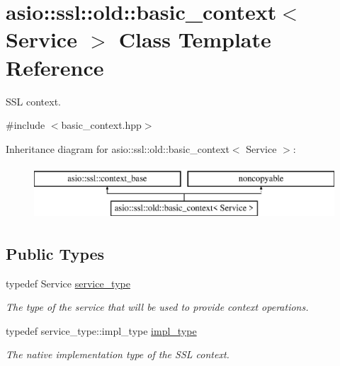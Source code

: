 \hypertarget{classasio_1_1ssl_1_1old_1_1basic__context}{}\section{asio\+:\+:ssl\+:\+:old\+:\+:basic\+\_\+context$<$ Service $>$ Class Template Reference}
\label{classasio_1_1ssl_1_1old_1_1basic__context}


S\+S\+L context.  




{\ttfamily \#include $<$basic\+\_\+context.\+hpp$>$}

Inheritance diagram for asio\+:\+:ssl\+:\+:old\+:\+:basic\+\_\+context$<$ Service $>$\+:\begin{figure}[H]
\begin{center}
\leavevmode
\includegraphics[height=2.000000cm]{classasio_1_1ssl_1_1old_1_1basic__context}
\end{center}
\end{figure}
\subsection*{Public Types}
\begin{DoxyCompactItemize}
\item 
typedef Service \hyperlink{classasio_1_1ssl_1_1old_1_1basic__context_a8e7a844e318b8d53600febd3953b03f0}{service\+\_\+type}
\begin{DoxyCompactList}\small\item\em The type of the service that will be used to provide context operations. \end{DoxyCompactList}\item 
typedef service\+\_\+type\+::impl\+\_\+type \hyperlink{classasio_1_1ssl_1_1old_1_1basic__context_a0ab28e5a1f4db7dbf190e6bb8931031a}{impl\+\_\+type}
\begin{DoxyCompactList}\small\item\em The native implementation type of the S\+S\+L context. \end{DoxyCompactList}\end{DoxyCompactItemize}

